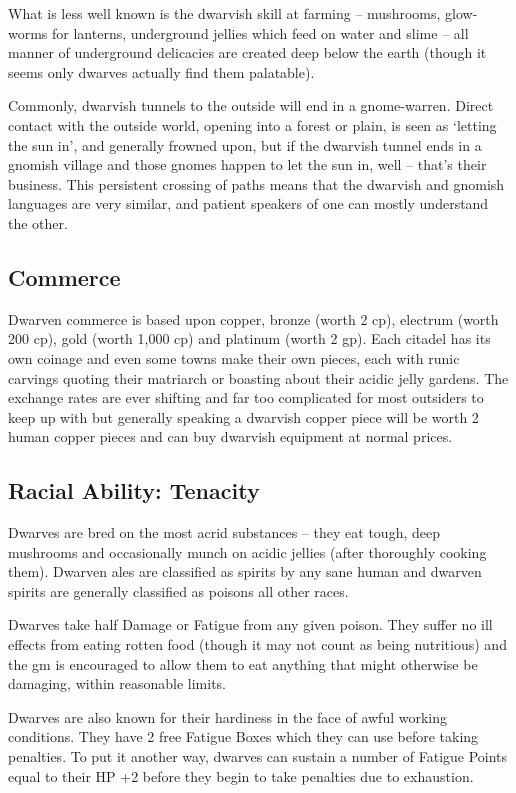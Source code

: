\documentclass[titlepage,a4paper,openany]{book}
\begin{document}
\begin{multicols}{2}
What is less well known is the dwarvish skill at farming -- mushrooms, glow-worms for lanterns, underground jellies which feed on water and slime -- all manner of underground delicacies are created deep below the earth (though it seems only dwarves actually find them palatable).

Commonly, dwarvish tunnels to the outside will end in a gnome-warren. Direct contact with the outside world, opening into a forest or plain, is seen as `letting the sun in', and generally frowned upon, but if the dwarvish tunnel ends in a gnomish village and those gnomes happen to let the sun in, well -- that's their business.
This persistent crossing of paths means that the dwarvish and gnomish languages are very similar, and patient speakers of one can mostly understand the other.

\subsection{Commerce}

Dwarven commerce is based upon copper, bronze (worth 2 cp), electrum (worth 200 cp), gold (worth 1,000 cp) and platinum (worth 2 gp). Each citadel has its own coinage and even some towns make their own pieces, each with runic carvings quoting their matriarch or boasting about their acidic jelly gardens. The exchange rates are ever shifting and far too complicated for most outsiders to keep up with but generally speaking a dwarvish copper piece will be worth 2 human copper pieces and can buy dwarvish equipment at normal prices.

\subsection{Racial Ability: Tenacity}

Dwarves are bred on the most acrid substances -- they eat tough, deep mushrooms and occasionally munch on acidic jellies (after thoroughly cooking them).
Dwarven ales are classified as spirits by any sane human and dwarven spirits are generally classified as poisons all other races.

Dwarves take half Damage or Fatigue from any given poison. They suffer no ill effects from eating rotten food (though it may not count as being nutritious) and the \gls{gm} is encouraged to allow them to eat anything that might otherwise be damaging, within reasonable limits.

Dwarves are also known for their hardiness in the face of awful working conditions. They have 2 free Fatigue Boxes which they can use before taking penalties. To put it another way, dwarves can sustain a number of Fatigue Points equal to their HP +2 before they begin to take penalties due to exhaustion.


\end{multicols}
\end{document}

